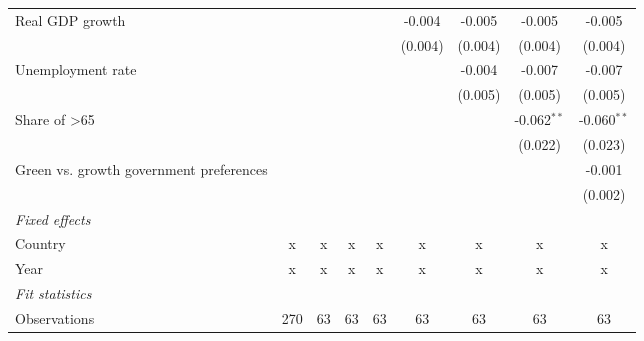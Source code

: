 \begin{table}[htbp]
\begin{tabular}{lcccccccc}
      Real GDP growth                                                                   &         &         &               &               & -0.004         & -0.005         & -0.005        & -0.005\\   
                                                                                        &         &         &               &               & (0.004)        & (0.004)        & (0.004)       & (0.004)\\   
      Unemployment rate                                                                 &         &         &               &               &                & -0.004         & -0.007        & -0.007\\   
                                                                                        &         &         &               &               &                & (0.005)        & (0.005)       & (0.005)\\   
      Share of >65                                                                      &         &         &               &               &                &                & -0.062$^{**}$ & -0.060$^{**}$\\   
                                                                                        &         &         &               &               &                &                & (0.022)       & (0.023)\\   
      Green vs. growth government preferences                                           &         &         &               &               &                &                &               & -0.001\\   
                                                                                        &         &         &               &               &                &                &               & (0.002)\\   
      \emph{Fixed effects}\\
      Country                                                                           & x       & x       & x             & x             & x              & x              & x             & x\\  
      Year                                                                              & x       & x       & x             & x             & x              & x              & x             & x\\  
      \midrule \emph{Fit statistics}\\
      Observations                                                                      & 270     & 63      & 63            & 63            & 63             & 63             & 63            & 63\\  

\end{tabular}
\end{table}
